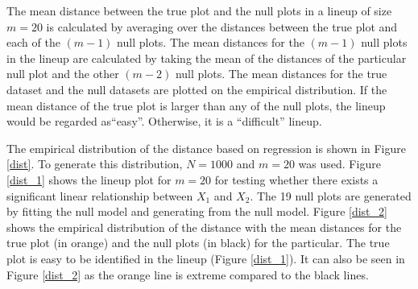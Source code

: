 \documentclass[12]{article}
\begin{document}
The mean distance between the true plot and the null plots in a lineup of size $m = 20$ is calculated by averaging over the distances between the true plot and each of the  $(m - 1)$ null plots. The mean distances for the $(m - 1)$ null plots in the lineup are calculated by taking the mean of the distances of the particular null plot and the other $(m - 2)$ null plots. The mean distances for the true dataset and the null datasets are plotted on the empirical distribution. If the mean distance of the true plot is larger than any of the null plots, the lineup would be regarded as``easy''. Otherwise, it is a ``difficult'' lineup. 

The empirical distribution of the distance based on regression is shown in Figure \ref{dist}. To generate this distribution, $N = 1000$ and $m = 20$ was used. Figure \ref{dist_1} shows the lineup plot for $m = 20$ for testing whether there exists a significant linear relationship between $X_1$ and $X_2$. The 19 null plots are generated by fitting the null model and generating from the null model. Figure \ref{dist_2} shows the empirical distribution of the distance with the mean distances for the true plot (in orange) and the null plots (in black) for the particular. The true plot is easy to be identified in the lineup (Figure \ref{dist_1}). It can also be seen in Figure \ref{dist_2} as the orange line is extreme compared to the black lines. 
\end{document}
